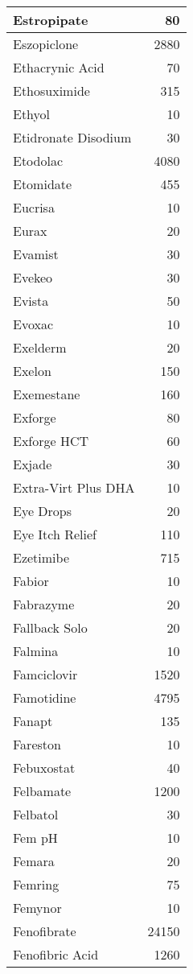\documentclass[
]{article}
\begin{document}
\begin{table}
\begin{tabular}[t]{l|r}
\hline
Estropipate & 80\\
\hline
Eszopiclone & 2880\\
\hline
Ethacrynic Acid & 70\\
\hline
Ethosuximide & 315\\
\hline
Ethyol & 10\\
\hline
Etidronate Disodium & 30\\
\hline
Etodolac & 4080\\
\hline
Etomidate & 455\\
\hline
Eucrisa & 10\\
\hline
Eurax & 20\\
\hline
Evamist & 30\\
\hline
Evekeo & 30\\
\hline
Evista & 50\\
\hline
Evoxac & 10\\
\hline
Exelderm & 20\\
\hline
Exelon & 150\\
\hline
Exemestane & 160\\
\hline
Exforge & 80\\
\hline
Exforge HCT & 60\\
\hline
Exjade & 30\\
\hline
Extra-Virt Plus DHA & 10\\
\hline
Eye Drops & 20\\
\hline
Eye Itch Relief & 110\\
\hline
Ezetimibe & 715\\
\hline
Fabior & 10\\
\hline
Fabrazyme & 20\\
\hline
Fallback Solo & 20\\
\hline
Falmina & 10\\
\hline
Famciclovir & 1520\\
\hline
Famotidine & 4795\\
\hline
Fanapt & 135\\
\hline
Fareston & 10\\
\hline
Febuxostat & 40\\
\hline
Felbamate & 1200\\
\hline
Felbatol & 30\\
\hline
Fem pH & 10\\
\hline
Femara & 20\\
\hline
Femring & 75\\
\hline
Femynor & 10\\
\hline
Fenofibrate & 24150\\
\hline
Fenofibric Acid & 1260\\

\end{tabular}
\end{table}
\end{document}
